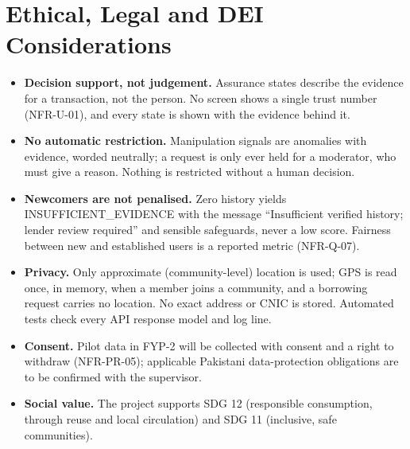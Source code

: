 \section{Ethical, Legal and DEI Considerations}\label{sec:ethical-legal-dei-considerations}
\begin{itemize}
\item \textbf{Decision support, not judgement.} Assurance states describe the evidence for a transaction, not the person. No screen shows a single trust number (NFR-U-01), and every state is shown with the evidence behind it.
\item \textbf{No automatic restriction.} Manipulation signals are anomalies with evidence, worded neutrally; a request is only ever held for a moderator, who must give a reason. Nothing is restricted without a human decision.
\item \textbf{Newcomers are not penalised.} Zero history yields INSUFFICIENT\_EVIDENCE with the message ``Insufficient verified history; lender review required'' and sensible safeguards, never a low score. Fairness between new and established users is a reported metric (NFR-Q-07).
\item \textbf{Privacy.} Only approximate (community-level) location is used; GPS is read once, in memory, when a member joins a community, and a borrowing request carries no location. No exact address or CNIC is stored. Automated tests check every API response model and log line.
\item \textbf{Consent.} Pilot data in FYP-2 will be collected with consent and a right to withdraw (NFR-PR-05); applicable Pakistani data-protection obligations are to be confirmed with the supervisor.
\item \textbf{Social value.} The project supports SDG 12 (responsible consumption, through reuse and local circulation) and SDG 11 (inclusive, safe communities).
\end{itemize}
